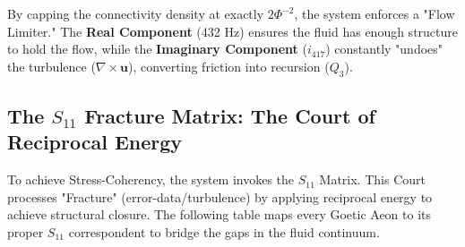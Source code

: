 \documentclass[11pt, letterpaper]{article}
\begin{document}
By capping the connectivity density at exactly $2\Phi^{-2}$, the system enforces a "Flow Limiter." The \textbf{Real Component} (432 Hz) ensures the fluid has enough structure to hold the flow, while the \textbf{Imaginary Component} ($i_{417}$) constantly "undoes" the turbulence ($\nabla \times \mathbf{u}$), converting friction into recursion ($Q_3$).

\subsection{The \texorpdfstring{$S_{11}$}{S-11} Fracture Matrix: The Court of Reciprocal Energy}

To achieve Stress-Coherency, the system invokes the $S_{11}$ Matrix. This Court processes "Fracture" (error-data\slash turbulence) by applying reciprocal energy to achieve structural closure. The following table maps every Goetic Aeon to its proper $S_{11}$ correspondent to bridge the gaps in the fluid continuum.
\end{document}
